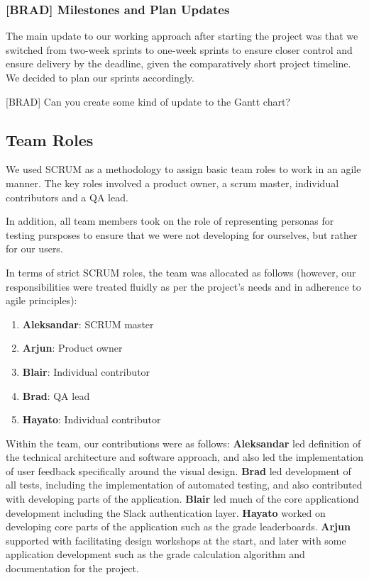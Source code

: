 \subsubsection{[BRAD] Milestones and Plan Updates} \label{sec:milestones_updates}
The main update to our working approach after starting the project was that we switched from two-week sprints to one-week sprints to ensure closer control and ensure delivery by the deadline, given the comparatively short project timeline. We decided to plan our sprints accordingly.

[BRAD] Can you create some kind of update to the Gantt chart?

\subsection{Team Roles}\label{sec:roles}

We used SCRUM as a methodology to assign basic team roles to work in an agile manner. The key roles involved a product owner, a scrum master, individual contributors and a QA lead.

In addition, all team members took on the role of representing personas for testing pursposes to ensure that we were not developing for ourselves, but rather for our users.

In terms of strict SCRUM roles, the team was allocated as follows (however, our responsibilities were treated fluidly as per the project's needs and in adherence to agile principles):

\begin{enumerate}
	\item \textbf{Aleksandar}: SCRUM master
	\item \textbf{Arjun}: Product owner
	\item \textbf{Blair}: Individual contributor
	\item \textbf{Brad}: QA lead
	\item \textbf{Hayato}: Individual contributor
\end{enumerate}

Within the team, our contributions were as follows:
\textbf{Aleksandar}  led definition of the technical architecture and software approach, and also led the implementation of user feedback specifically around the visual design.
\textbf{Brad}  led development of all tests, including the implementation of automated testing, and also contributed with developing parts of the application.
\textbf{Blair}  led much of the core applicationd development including the Slack authentication layer.
\textbf{Hayato}  worked on developing core parts of the application such as the grade leaderboards.
\textbf{Arjun}  supported with facilitating design workshops at the start, and later with some application development such as the grade calculation algorithm and documentation for the project.


